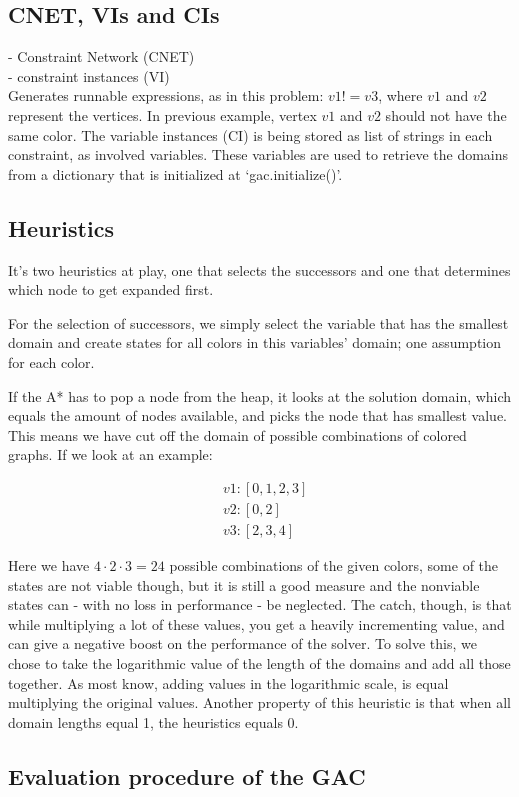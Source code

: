 

\subsection{CNET, VIs and CIs}
- Constraint Network (CNET)\\
- constraint instances (VI)\\
Generates runnable expressions, as in this problem: \( v1 != v3 \), where \(v1\) and \(v2\) represent the vertices. In previous example, vertex \(v1\) and \(v2\) should not have the same color. The variable instances (CI) is being stored as list of strings in each constraint, as involved variables. These variables are used to retrieve the domains from a dictionary that is initialized at `gac.initialize()'.



\subsection*{Heuristics}
It's two heuristics at play, one that selects the successors and one that determines which node to get expanded first.

For the selection of successors, we simply select the variable that has the smallest domain and create states for all colors in this variables' domain; one assumption for each color.

If the A* has to pop a node from the heap, it looks at the solution domain, which equals the amount of nodes available, and picks the node that has smallest value. This means we have cut off the domain of possible combinations of colored graphs. If we look at an example:

\begin{align*}
	&v1: [0,1,2,3]\\
	&v2: [0,2]\\
	&v3: [2,3,4]
\end{align*}

Here we have \(4 \cdot 2 \cdot 3 = 24\) possible combinations of the given colors, some of the states are not viable though, but it is still a good measure and the nonviable states can - with no loss in performance - be neglected. The catch, though, is that while multiplying a lot of these values, you get a heavily incrementing value, and can give a negative boost on the performance of the solver. To solve this, we chose to take the logarithmic value of the length of the domains and add all those together. As most know, adding values in the logarithmic scale, is equal multiplying the original values. Another property of this heuristic is that when all domain lengths equal 1, the heuristics equals 0.

\subsection{Evaluation procedure of the GAC}
